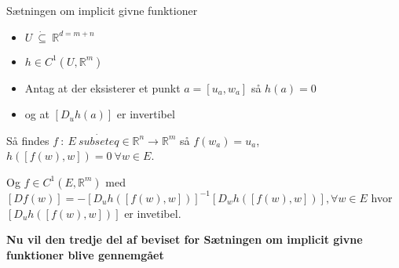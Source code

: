 \begin{boks}{Sætningen om implicit givne funktioner}
  \begin{itemize}[label = $\ast$]
    \item $U \ \dot{\subseteq} \ \mathbb{R}^{d = m + n}$
    \item $h \in C^1(U, \mathbb{R}^m)$
    \item Antag at der eksisterer et punkt $a = [u_a, w_a]$ så $h(a) = 0$
    \item og at $[D_u h(a)]$ er invertibel
  \end{itemize}

  Så findes $f \ : \ E \ \dot{subseteq} \in \mathbb{R}^n \rightarrow \mathbb{R}^m$ så $f(w_a) = u_a$, $h([f(w), w]) = 0 \ \forall w \in E$.

  Og $f \in C^1(E, \mathbb{R}^m)$ med $[Df(w)] = -[D_u h([f(w), w])]^{-1}[D_w h([f(w), w])], \forall w \in E$ hvor $[D_u h([f(w), w])]$ er invetibel.
\end{boks}

\textbf{Nu vil den tredje del af beviset for Sætningen om implicit givne funktioner blive gennemgået}


